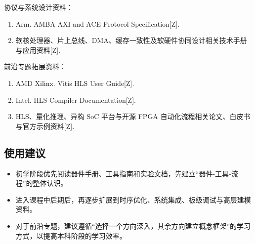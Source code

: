 协议与系统设计资料：

\begin{enumerate}
\def\labelenumi{\arabic{enumi}.}
\tightlist
\item
  Arm. AMBA AXI and ACE Protocol Specification{[}Z{]}.
\item
  软核处理器、片上总线、DMA、缓存一致性及软硬件协同设计相关技术手册与应用资料{[}Z{]}.
\end{enumerate}

前沿专题拓展资料：

\begin{enumerate}
\def\labelenumi{\arabic{enumi}.}
\tightlist
\item
  AMD Xilinx. Vitis HLS User Guide{[}Z{]}.
\item
  Intel. HLS Compiler Documentation{[}Z{]}.
\item
  HLS、量化推理、异构 SoC 平台与开源 FPGA
  自动化流程相关论文、白皮书与官方示例资料{[}Z{]}.
\end{enumerate}

\subsection*{使用建议}\label{使用建议}

\begin{itemize}
\tightlist
\item
  初学阶段优先阅读器件手册、工具指南和实验文档，先建立``器件-工具-流程''的整体认识。
\item
  进入课程中后期后，再逐步扩展到时序优化、系统集成、板级调试与高层建模资料。
\item
  对于前沿专题，建议遵循``选择一个方向深入，其余方向建立概念框架''的学习方式，以提高本科阶段的学习效率。
\end{itemize}
